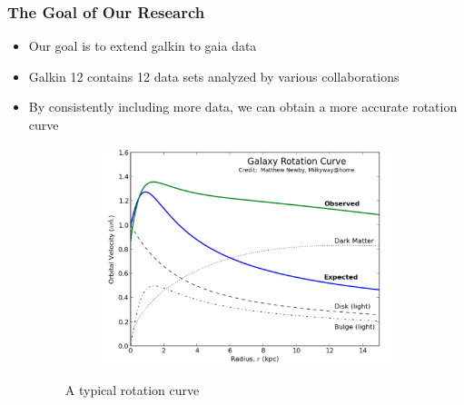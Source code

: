 \documentclass{beamer}
\begin{document}
\begin{frame}
\frametitle{The Goal of Our Research}
\begin{itemize}
\item Our goal is to extend galkin to gaia data
\item Galkin 12 contains 12 data sets analyzed by various collaborations
\item By consistently including more data, we can obtain a more accurate rotation curve
\begin{figure}[h!]
  \centering
  \begin{subfigure}[b]{0.4\linewidth}
    \includegraphics[width=\linewidth]{RotCurve}
  \end{subfigure}
    \caption{A typical rotation curve}
\end{figure}



\end{itemize}
\end{frame}
\end{document}
